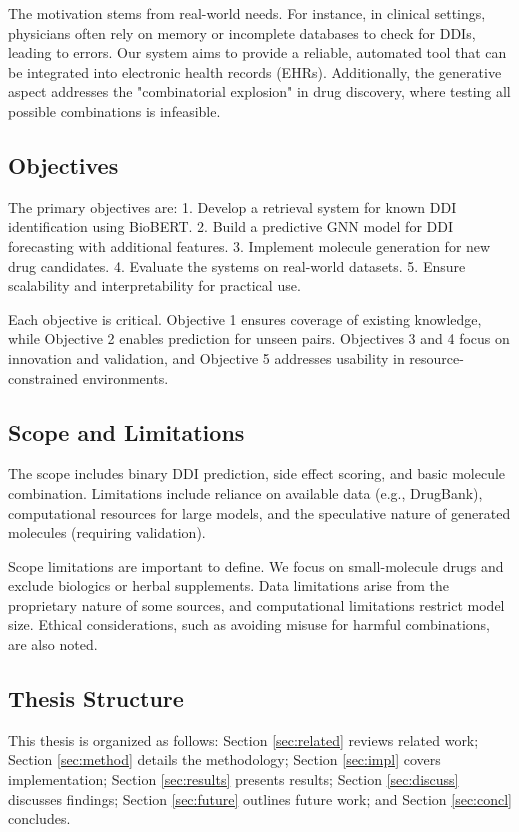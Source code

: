 \documentclass[12pt,a4paper]{article}
\begin{document}
The motivation stems from real-world needs. For instance, in clinical settings, physicians often rely on memory or incomplete databases to check for DDIs, leading to errors. Our system aims to provide a reliable, automated tool that can be integrated into electronic health records (EHRs). Additionally, the generative aspect addresses the "combinatorial explosion" in drug discovery, where testing all possible combinations is infeasible.

\subsection{Objectives}
The primary objectives are:
1. Develop a retrieval system for known DDI identification using BioBERT.
2. Build a predictive GNN model for DDI forecasting with additional features.
3. Implement molecule generation for new drug candidates.
4. Evaluate the systems on real-world datasets.
5. Ensure scalability and interpretability for practical use.

Each objective is critical. Objective 1 ensures coverage of existing knowledge, while Objective 2 enables prediction for unseen pairs. Objectives 3 and 4 focus on innovation and validation, and Objective 5 addresses usability in resource-constrained environments.

\subsection{Scope and Limitations}
The scope includes binary DDI prediction, side effect scoring, and basic molecule combination. Limitations include reliance on available data (e.g., DrugBank), computational resources for large models, and the speculative nature of generated molecules (requiring validation).

Scope limitations are important to define. We focus on small-molecule drugs and exclude biologics or herbal supplements. Data limitations arise from the proprietary nature of some sources, and computational limitations restrict model size. Ethical considerations, such as avoiding misuse for harmful combinations, are also noted.

\subsection{Thesis Structure}
This thesis is organized as follows: Section \ref{sec:related} reviews related work; Section \ref{sec:method} details the methodology; Section \ref{sec:impl} covers implementation; Section \ref{sec:results} presents results; Section \ref{sec:discuss} discusses findings; Section \ref{sec:future} outlines future work; and Section \ref{sec:concl} concludes.
\end{document}

